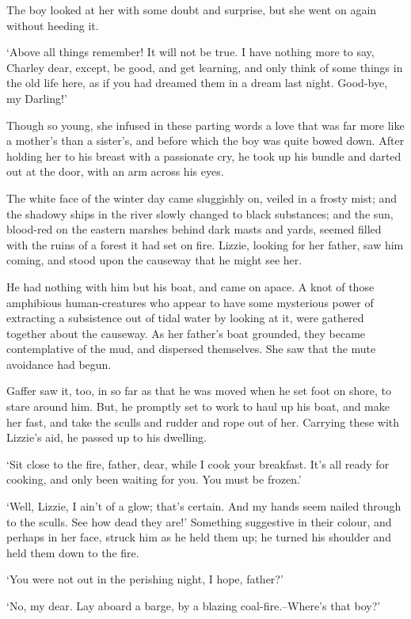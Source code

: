 The boy looked at her with some doubt and surprise, but she went on
again without heeding it.

‘Above all things remember! It will not be true. I have nothing more to
say, Charley dear, except, be good, and get learning, and only think of
some things in the old life here, as if you had dreamed them in a dream
last night. Good-bye, my Darling!’

Though so young, she infused in these parting words a love that was far
more like a mother’s than a sister’s, and before which the boy was quite
bowed down. After holding her to his breast with a passionate cry, he
took up his bundle and darted out at the door, with an arm across his
eyes.

The white face of the winter day came sluggishly on, veiled in a
frosty mist; and the shadowy ships in the river slowly changed to black
substances; and the sun, blood-red on the eastern marshes behind dark
masts and yards, seemed filled with the ruins of a forest it had set on
fire. Lizzie, looking for her father, saw him coming, and stood upon the
causeway that he might see her.

He had nothing with him but his boat, and came on apace. A knot of those
amphibious human-creatures who appear to have some mysterious power
of extracting a subsistence out of tidal water by looking at it, were
gathered together about the causeway. As her father’s boat grounded,
they became contemplative of the mud, and dispersed themselves. She saw
that the mute avoidance had begun.

Gaffer saw it, too, in so far as that he was moved when he set foot on
shore, to stare around him. But, he promptly set to work to haul up his
boat, and make her fast, and take the sculls and rudder and rope out of
her. Carrying these with Lizzie’s aid, he passed up to his dwelling.

‘Sit close to the fire, father, dear, while I cook your breakfast.
It’s all ready for cooking, and only been waiting for you. You must be
frozen.’

‘Well, Lizzie, I ain’t of a glow; that’s certain. And my hands seem
nailed through to the sculls. See how dead they are!’ Something
suggestive in their colour, and perhaps in her face, struck him as he
held them up; he turned his shoulder and held them down to the fire.

‘You were not out in the perishing night, I hope, father?’

‘No, my dear. Lay aboard a barge, by a blazing coal-fire.--Where’s that
boy?’

